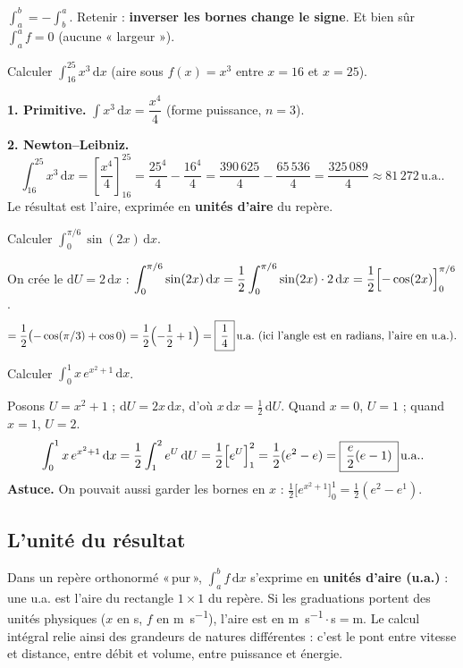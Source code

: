 \documentclass[11pt,a4paper]{article}
\newcommand{\dd}{\mathrm{d}}
\newcommand{\ua}{\,\text{u.a.}}   %
\begin{document}
\begin{attention}
$\int_a^b=-\int_b^a$. Retenir : \textbf{inverser les bornes change le signe}. Et bien sûr
$\int_a^a f=0$ (aucune « largeur »).
\end{attention}

\begin{exemple}
Calculer $\displaystyle\int_{16}^{25} x^3\,\dd x$ (aire sous $f(x)=x^3$ entre $x=16$ et $x=25$).

\smallskip
\textbf{1. Primitive.} $\int x^3\,\dd x=\dfrac{x^4}{4}$ (forme puissance, $n=3$).

\textbf{2. Newton--Leibniz.}
\[
\int_{16}^{25} x^3\,\dd x=\left[\frac{x^4}{4}\right]_{16}^{25}
=\frac{25^4}{4}-\frac{16^4}{4}
=\frac{390\,625}{4}-\frac{65\,536}{4}
=\frac{325\,089}{4}\approx 81\,272\ua.
\]
Le résultat est l'aire, exprimée en \textbf{unités d'aire} du repère.
\end{exemple}

\begin{exemple}
Calculer $\displaystyle\int_0^{\pi/6}\sin(2x)\,\dd x$.

\smallskip
On crée le $\dd U=2\,\dd x$ : $\displaystyle\int_0^{\pi/6}\sin(2x)\,\dd x
=\frac12\int_0^{\pi/6}\sin(2x)\cdot 2\,\dd x
=\frac12\Bigl[-\cos(2x)\Bigr]_0^{\pi/6}$.
\[
=\frac12\bigl(-\cos(\pi/3)+\cos 0\bigr)=\frac12\Bigl(-\frac12+1\Bigr)
=\boxed{\,\frac14\,}\ua\ (\text{ici l'angle est en radians, l'aire en u.a.}).
\]
\end{exemple}

\begin{exemple}[utiliser le $\dd U$ déjà présent]
Calculer $\displaystyle\int_0^1 x\,e^{x^2+1}\,\dd x$.

\smallskip
Posons $U=x^2+1$ ; $\dd U=2x\,\dd x$, d'où $x\,\dd x=\tfrac12\,\dd U$. Quand $x=0$, $U=1$ ;
quand $x=1$, $U=2$.
\[
\int_0^1 x\,e^{x^2+1}\,\dd x=\frac12\int_1^2 e^{U}\,\dd U
=\frac12\Bigl[e^{U}\Bigr]_1^2=\frac12(e^2-e)=\boxed{\,\frac{e}{2}(e-1)\,}\ua.
\]
\textbf{Astuce.} On pouvait aussi garder les bornes en $x$ :
$\frac12\bigl[e^{x^2+1}\bigr]_0^1=\frac12(e^2-e^1)$.
\end{exemple}

\subsection{L'unité du résultat}

\begin{remarque}
Dans un repère orthonormé «\,pur\,», $\int_a^b f\,\dd x$ s'exprime en \textbf{unités d'aire (u.a.)} :
une u.a. est l'aire du rectangle $1\times 1$ du repère. Si les graduations portent des unités
physiques ($x$ en \si{\second}, $f$ en \si{\metre\per\second}), l'aire est en
\si{\metre\per\second}\,$\cdot$\,\si{\second}$=$\si{\metre}. Le calcul intégral relie ainsi des
grandeurs de natures différentes : c'est le pont entre vitesse et distance, entre débit et volume,
entre puissance et énergie.
\end{remarque}
\end{document}
